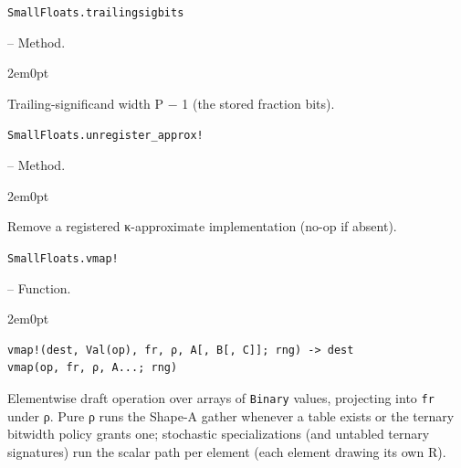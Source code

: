 \par\medskip\noindent\begin{minipage}{\linewidth}
\hypertarget{7146146650466703616}{\texttt{SmallFloats.trailingsigbits}}  -- {Method.}
\nopagebreak
\begin{adjustwidth}{2em}{0pt}

Trailing-significand width P − 1 (the stored fraction bits).



\end{adjustwidth}
\end{minipage}
\par\medskip

\par\medskip\noindent\begin{minipage}{\linewidth}
\hypertarget{7419061690047571527}{\texttt{SmallFloats.unregister\_\allowbreak{}approx!}}  -- {Method.}
\nopagebreak
\begin{adjustwidth}{2em}{0pt}

Remove a registered κ-approximate implementation (no-op if absent).



\end{adjustwidth}
\end{minipage}
\par\medskip

\par\medskip\noindent\begin{minipage}{\linewidth}
\hypertarget{5240195886209104356}{\texttt{SmallFloats.vmap!}}  -- {Function.}
\nopagebreak
\begin{adjustwidth}{2em}{0pt}


\begin{verbatim}
vmap!(dest, Val(op), fr, ρ, A[, B[, C]]; rng) -> dest
vmap(op, fr, ρ, A...; rng)
\end{verbatim}

Elementwise draft operation over arrays of \texttt{Binary} values, projecting into \texttt{fr} under ρ. Pure ρ runs the Shape-A gather whenever a table exists or the ternary bitwidth policy grants one; stochastic specializations (and untabled ternary signatures) run the scalar path per element (each element drawing its own R).



\end{adjustwidth}
\end{minipage}
\par\medskip

